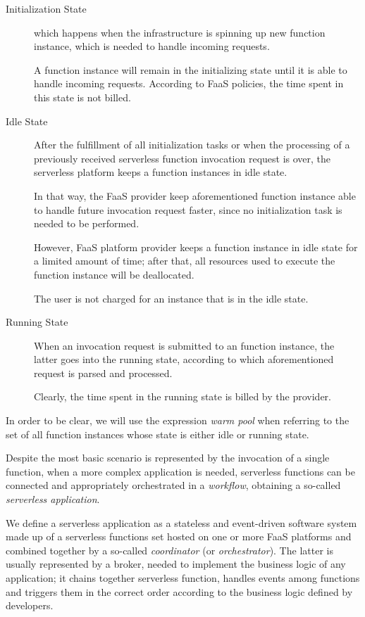 \documentclass[12pt,a4paper]{report}
\begin{document}
\begin{description}
	
	\item[Initialization State] which happens when the infrastructure is spinning up new function instance, which is needed to handle incoming requests. 
	
	A function instance will remain in the initializing state until it is able to handle incoming requests. According to FaaS policies, the time spent in this state is not billed. 
	
	\item[Idle State] After the fulfillment of all initialization tasks or when the processing of a previously received serverless function invocation request is over, the serverless platform keeps a function instances in idle state.
	
	In that way, the FaaS provider keep aforementioned function instance able to handle future invocation request faster, since no initialization task is needed to be performed.
	
	However, FaaS platform provider keeps a function instance in idle state for a limited amount of time; after that, all resources used to execute the function instance will be deallocated.
	
	The user is not charged for an instance that is in the idle state.
	
	\item[Running State] When an invocation request is submitted to an function instance, the latter goes into the running state, according to which aforementioned request is parsed and processed.
	
	Clearly, the time spent in the running state is billed by the provider.
	
\end{description}

In order to be clear, we will use the expression \textit{warm pool} when referring to the set of all function instances whose state is either idle or running state.

Despite the most basic scenario is represented by the invocation of a single function, when a more complex application is needed, serverless functions can be connected and appropriately orchestrated in a \textit{workflow}, obtaining a so-called \textit{serverless application}.

We define a serverless application as a stateless and event-driven software system made up of a serverless functions set hosted on one or more FaaS platforms and combined together by a so-called \textit{coordinator} (or \textit{orchestrator}). The latter is usually represented by a broker, needed to implement the business logic of any application; it chains together serverless function, handles events among functions and triggers them in the correct order according to the business logic defined by developers. 
\end{document}
